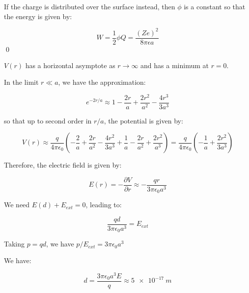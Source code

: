 \documentclass[12pt]{article}
\begin{document}
If the charge is distributed over the surface instead, then $\phi$ is a constant so that the energy is given by:

\begin{equation}
    W = \frac{1}{2} \phi Q = \frac{(Ze)^{2}}{8\pi \epsilon a}
\end{equation}
\qed



$V(r)$ has a horizontal asymptote as $r \to \infty$ and has a minimum at $r = 0$.

\begin{center}
    
\end{center}

In the limit $r \ll a$, we have the approximation:

\begin{equation}
    e^{-2r/a} \approx 1 - \frac{2r}{a} + \frac{2r^{2}}{a^{2}} - \frac{4r^{3}}{3a^{3}}
\end{equation}

so that up to second order in $r/a$, the potential is given by:

\begin{equation}
    V(r) \approx \frac{q}{4\pi \epsilon_{0}} \left( -\frac{2}{a} + \frac{2r}{a^{2}} - \frac{4r^{2}}{3a^{3}} + \frac{1}{a} - \frac{2r}{a^{2}} + \frac{2r^{2}}{a^{3}} \right) = \frac{q}{4\pi \epsilon_{0}} \left( -\frac{1}{a} + \frac{2r^{2}}{3a^{3}} \right)
\end{equation}

Therefore, the electric field is given by:

\begin{equation}
    E(r) = -\frac{\partial V}{\partial r} \approx -\frac{qr}{3\pi \epsilon_{0} a^{3}}
\end{equation}

We need $E(d) + E_{ext} = 0$, leading to:

\begin{equation}
    \frac{qd}{3\pi \epsilon_{0} a^{3}} = E_{ext}
\end{equation}

Taking $p = qd$, we have $p/E_{ext} = 3\pi \epsilon_{0} a^{3}$

We have:

\begin{equation}
    d = \frac{3\pi \epsilon_{0} a^{3} E}{q} \approx \qty{5e-17}{m}
\end{equation}
\end{document}
